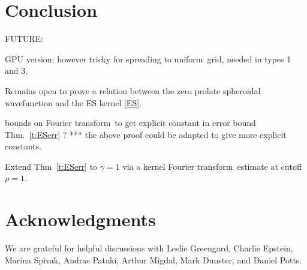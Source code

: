 \documentclass[10pt]{article}
\newcommand{\U}{{uniform}}
\newcommand{\FT}{Fourier transform}
\begin{document}
\section{Conclusion}




FUTURE:

GPU version; however tricky for spreading to \U\ grid, needed in types 1 and 3.

Remains open to prove a relation between the zero prolate spheroidal
wavefunction and the ES kernel \eqref{ES}.

bounds on \FT\ to get
explicit constant in error bound Thm.~\ref{t:ESerr} ?
*** the above proof could be adapted to give more explicit constants.


Extend Thm~\ref{t:ESerr} to $\gamma=1$ via a kernel \FT\ estimate at cutoff
$\rho=1$.


\section*{Acknowledgments}

We are grateful for helpful discussions with Leslie Greengard,
Charlie Epstein, Marina Spivak, Andras Pataki, Arthur Migdal,
Mark Dunster, and Daniel Potts.




\end{document}
